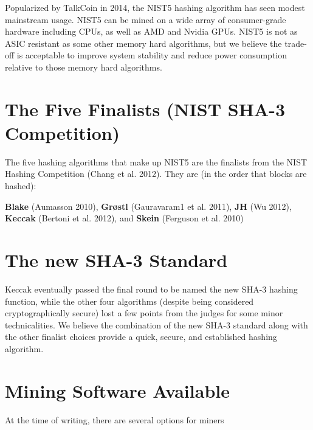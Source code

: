 \documentclass[11pt,a4paperpaper,]{report}
\begin{document}
Popularized by TalkCoin in 2014, the NIST5 hashing algorithm has seen
modest mainstream usage. NIST5 can be mined on a wide array of
consumer-grade hardware including CPUs, as well as AMD and Nvidia GPUs.
NIST5 is not as ASIC resistant as some other memory hard algorithms, but
we believe the trade-off is acceptable to improve system stability and
reduce power consumption relative to those memory hard algorithms.

\section{The Five Finalists (NIST SHA-3
Competition)}\label{the-five-finalists-nist-sha-3-competition}

The five hashing algorithms that make up NIST5 are the finalists from
the NIST Hashing Competition (Chang et al. 2012). They are (in the order
that blocks are hashed):

\textbf{Blake} (Aumasson 2010), \textbf{Grøstl} (Gauravaram1 et al.
2011), \textbf{JH} (Wu 2012), \textbf{Keccak} (Bertoni et al. 2012), and
\textbf{Skein} (Ferguson et al. 2010)

\section{The new SHA-3 Standard}\label{the-new-sha-3-standard}

Keccak eventually passed the final round to be named the new SHA-3
hashing function, while the other four algorithms (despite being
considered cryptographically secure) lost a few points from the judges
for some minor technicalities. We believe the combination of the new
SHA-3 standard along with the other finalist choices provide a quick,
secure, and established hashing algorithm.

\section{Mining Software Available}\label{mining-software-available}

At the time of writing, there are several options for miners
\end{document}

